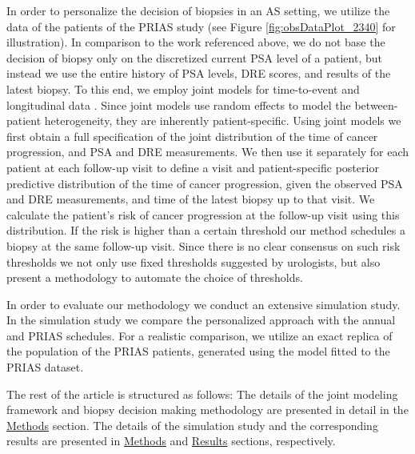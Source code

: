 In order to personalize the decision of biopsies in an AS setting, we utilize the data of the patients of the PRIAS study (see Figure \ref{fig:obsDataPlot_2340} for illustration). In comparison to the work referenced above, we do not base the decision of biopsy only on the discretized current PSA level of a patient, but instead we use the entire history of PSA levels, DRE scores, and results of the latest biopsy. To this end, we employ joint models for time-to-event and longitudinal data \cite{tsiatis2004joint,rizopoulos2012joint}. Since joint models use random effects \cite{laird1982random} to model the between-patient heterogeneity, they are inherently patient-specific. Using joint models we first obtain a full specification of the joint distribution of the time of cancer progression, and PSA and DRE measurements. We then use it separately for each patient at each follow-up visit to define a visit and patient-specific posterior predictive distribution of the time of cancer progression, given the observed PSA and DRE measurements, and time of the latest biopsy up to that visit. We calculate the patient's risk of cancer progression at the follow-up visit using this distribution. If the risk is higher than a certain threshold our method schedules a biopsy at the same follow-up visit. Since there is no clear consensus on such risk thresholds we not only use fixed thresholds suggested by urologists, but also present a methodology to automate the choice of thresholds. 

In order to evaluate our methodology we conduct an extensive simulation study. In the simulation study we compare the personalized approach with the annual and PRIAS schedules. For a realistic comparison, we utilize an exact replica of the population of the PRIAS patients, generated using the model fitted to the PRIAS dataset.

The rest of the article is structured as follows: The details of the joint modeling framework and biopsy decision making methodology are presented in detail in the \hyperref[sec:methods]{Methods} section. The details of the simulation study and the corresponding results are presented in \hyperref[sec:methods]{Methods} and \hyperref[sec:results]{Results} sections, respectively.